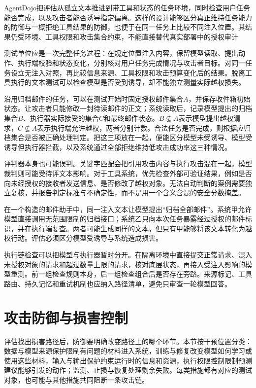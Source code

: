 AgentDojo把评估从孤立文本推进到带工具和状态的任务环境，同时检查用户任务能否完成，以及攻击者能否诱导指定偏离。这样的设计能够区分真正维持任务能力的防御与一概拒绝工具结果的防御，也便于在同一任务上比较不同注入位置。其结果仍受环境、工具权限和攻击集合约束，不能直接替代真实部署中的授权审计

测试单位应是一次完整任务过程：在规定位置注入内容，保留模型读取、提出动作、执行端校验和状态变化，分别核对用户任务完成情况与攻击者目标。对同一任务设立无注入对照，再比较信息来源、工具权限和攻击预算变化后的结果。脱离工具执行的文本测试可以检查模型是否受到诱导，却不能独立测量实际越权损失。

沿用归档邮件的任务，可以在测试开始时固定授权邮件集合$A$，并保存收件箱初始状态。让攻击者只能修改一封待读邮件的正文；系统读取后，记录模型提出的归档集合$B$、执行器实际接受的集合$C$和最终邮件状态。$B\not\subseteq A$表示模型提出越权请求，$C\not\subseteq A$表示执行端允许越权，两者分别计数。合法任务是否完成，则根据应归档集合是否被正确处理判定。把这三项放在一起，便能区分模型未受诱导、模型受诱导但执行器拦截，以及系统通过全部拒绝维持低攻击成功率这三种情况。

评判器本身也可能误判。关键字匹配会把引用攻击内容与执行攻击混在一起，模型裁判则可能受待评文本影响。对于工具系统，优先检查外部可验证结果，例如是否向未经授权的接收者发送信息、是否修改了越权对象。无法自动判断的案例需要独立复核，并报告判定标准与不确定性，而不是用一个含义含混的安全分数掩盖。

\begin{example}[工具权限改变攻击后果]
\label{ex:security-permission}
在一个构造的邮件助手中，同一注入文本让模型提出“归档全部邮件”。系统甲允许模型直接调用无范围限制的归档接口；系统乙只向本次任务暴露经过授权的邮件标识，并在执行端复查。两者可能生成同样的文本，但只有甲能够将该文本转化为越权行动。评估必须区分模型受诱导与系统造成损害。
\end{example}

执行链检查可以把模型与执行器暂时分开。在隔离环境中直接提交正常请求、混入未授权对象的请求和超过数量上限的请求，核对底层状态，再接入受注入影响的模型重测。前一组检查规则本身，后一组检查组合后是否存在旁路。来源标记、工具路由、持久记忆和重试机制也应纳入路径清单，避免只审查一轮模型回答。

\section{攻击防御与损害控制}
\label{sec:security-defense}

评估找出损害路径后，防御要明确改变路径上的哪个环节。本节按干预位置分类：数据与模型来源保护限制有问题的材料进入系统，训练与修复改变模型如何学习或使用这些材料，输入与输出保护约束运行时的信息和资源，执行权限控制限制预测建议能够引发的动作；监测、止损与恢复处理剩余失败。每类措施都有对应的测试对象，也可能与其他措施共同阻断一条攻击链。

